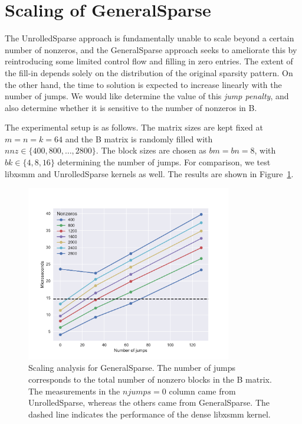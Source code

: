 \section{Scaling of GeneralSparse}
\label{section:exp_jump_scaling}

The UnrolledSparse approach is fundamentally unable to scale beyond a certain number of nonzeros, and the GeneralSparse approach seeks to ameliorate this by reintroducing some limited control flow and filling in zero entries. The extent of the fill-in depends solely on the distribution of the original sparsity pattern. On the other hand, the time to solution is expected to increase linearly with the number of jumps. We would like determine the value of this \emph{jump penalty}, and also determine whether it is sensitive to the number of nonzeros in B.

The experimental setup is as follows. The matrix sizes are kept fixed at $m=n=k=64$ and the B matrix is randomly filled with $nnz \in \{400, 800, \ldots, 2800\}$. The block sizes are chosen as $bm = bn = 8$, with $bk \in \{4,8,16\}$ determining the number of jumps. For comparison, we test libxsmm and UnrolledSparse kernels as well. The results are shown in Figure~\ref{fig:jump_scaling}.

  \begin{figure}[h]
      \centering
      \includegraphics[width=0.8\textwidth]{images/jump_penalty_new.pdf}
      \caption{Scaling analysis for GeneralSparse. The number of jumps corresponds to the total number of nonzero blocks in the B matrix. The measurements in the $njumps=0$ column came from UnrolledSparse, whereas the others came from GeneralSparse. The dashed line indicates the performance of the dense libxsmm kernel.}
      \label{fig:jump_scaling}
  \end{figure}


